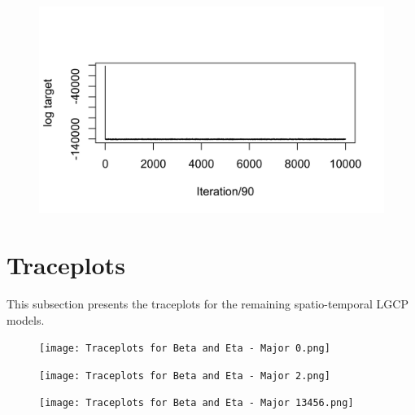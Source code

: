 \begin{appendices}
    \begin{figure}[H]
        \begin{center}
            \includegraphics{Log Target Plot - ST - Major 13456.png}
        \end{center}
    \end{figure}

    \newpage

\section{Traceplots} \label{app:trace-plots}

    This subsection presents the traceplots for the remaining spatio-temporal LGCP models.

    \begin{figure}[H]
        \begin{center}
            \texttt{[image: Traceplots for Beta and Eta - Major 0.png]}
        \end{center}
    \end{figure}

    \begin{figure}[h]
        \begin{center}
            \texttt{[image: Traceplots for Beta and Eta - Major 2.png]}
        \end{center}
    \end{figure}

    \begin{figure}[H]
        \begin{center}
            \texttt{[image: Traceplots for Beta and Eta - Major 13456.png]}
        \end{center}
    \end{figure}


\end{appendices}
